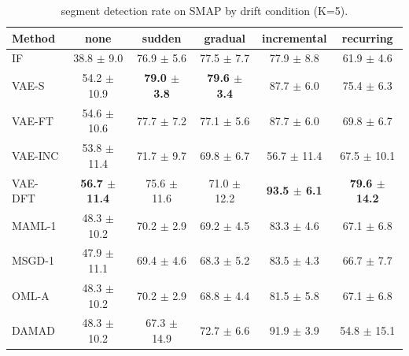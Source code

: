 \begin{table}[t]
\centering
\small
\caption{segment detection rate on SMAP by drift condition (K=5).}
\label{tab:drift_segment_detection_rate_smap}
\begin{tabular}{lccccc}
\toprule
Method & none & sudden & gradual & incremental & recurring \\
\midrule
IF & 38.8 $\pm$ 9.0 & 76.9 $\pm$ 5.6 & 77.5 $\pm$ 7.7 & 77.9 $\pm$ 8.8 & 61.9 $\pm$ 4.6 \\
VAE-S & 54.2 $\pm$ 10.9 & \textbf{79.0 $\pm$ 3.8} & \textbf{79.6 $\pm$ 3.4} & 87.7 $\pm$ 6.0 & 75.4 $\pm$ 6.3 \\
VAE-FT & 54.6 $\pm$ 10.6 & 77.7 $\pm$ 7.2 & 77.1 $\pm$ 5.6 & 87.7 $\pm$ 6.0 & 69.8 $\pm$ 6.7 \\
VAE-INC & 53.8 $\pm$ 11.4 & 71.7 $\pm$ 9.7 & 69.8 $\pm$ 6.7 & 56.7 $\pm$ 11.4 & 67.5 $\pm$ 10.1 \\
VAE-DFT & \textbf{56.7 $\pm$ 11.4} & 75.6 $\pm$ 11.6 & 71.0 $\pm$ 12.2 & \textbf{93.5 $\pm$ 6.1} & \textbf{79.6 $\pm$ 14.2} \\
MAML-1 & 48.3 $\pm$ 10.2 & 70.2 $\pm$ 2.9 & 69.2 $\pm$ 4.5 & 83.3 $\pm$ 4.6 & 67.1 $\pm$ 6.8 \\
MSGD-1 & 47.9 $\pm$ 11.1 & 69.4 $\pm$ 4.6 & 68.3 $\pm$ 5.2 & 83.5 $\pm$ 4.3 & 66.7 $\pm$ 7.7 \\
OML-A & 48.3 $\pm$ 10.2 & 70.2 $\pm$ 2.9 & 68.8 $\pm$ 4.4 & 81.5 $\pm$ 5.8 & 67.1 $\pm$ 6.8 \\
DAMAD & 48.3 $\pm$ 10.2 & 67.3 $\pm$ 14.9 & 72.7 $\pm$ 6.6 & 91.9 $\pm$ 3.9 & 54.8 $\pm$ 15.1 \\
\bottomrule
\end{tabular}
\end{table}

